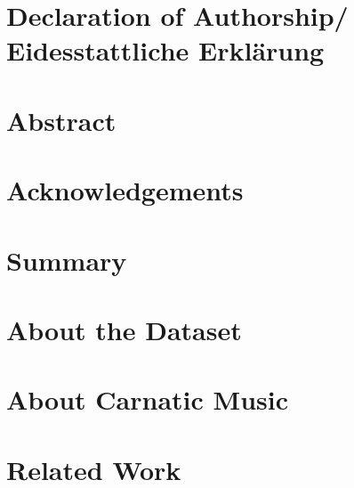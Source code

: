 \documentclass[12pt, twoside, openright]{book}
\begin{document}

\newpage
\thispagestyle{empty}
\mbox{}

\frontmatter

\chapter*{Declaration of Authorship/\\Eidesstattliche Erkl\"arung}

\newpage
\thispagestyle{empty}
\mbox{}

\chapter*{Abstract}

\newpage 
\thispagestyle{empty}
\mbox{}

\chapter*{Acknowledgements}

\newpage 
\thispagestyle{empty}
\mbox{}

\tableofcontents


\cleardoublepage
{}
\listoffigures
{}
\listoftables

\mainmatter

\chapter{Summary} \label{problem-def}


\chapter{About the Dataset} \label{about-ds}


\chapter{About Carnatic Music} \label{about-car}


\chapter{Related Work}\label{context}
 
\end{document}

